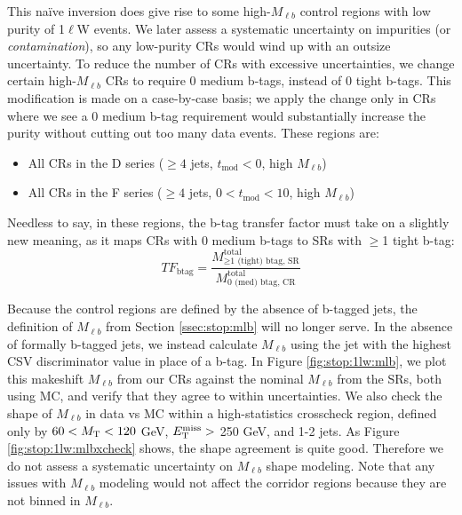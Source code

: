 This na\"{i}ve inversion does give rise to some high-$M_{\ell b}$ control regions with low
purity of 1$\ell$W events. We later assess a systematic uncertainty on
impurities (or \emph{contamination}), so any low-purity CRs would wind up
with an outsize uncertainty. To reduce the number of CRs with
excessive uncertainties, we change certain high-$M_{\ell b}$ CRs to
require 0 medium b-tags, instead of 0 tight b-tags. This modification
is made on a case-by-case basis; we apply the change only in CRs where
we see a 0 medium b-tag requirement would substantially increase the
purity without cutting out too many data events. These regions are:
\begin{itemize}
\item All CRs in the D series ($\geq 4$ jets, $t_\text{mod} < 0$, high $M_{\ell b}$)
\item All CRs in the F series ($\geq 4$ jets, $0 < t_\text{mod} < 10$, high $M_{\ell b}$)
\end{itemize}
Needless to say, in these regions, the b-tag transfer factor must take
on a slightly new meaning, as it maps CRs with 0 medium b-tags to
SRs with $\geq$1 tight b-tag:
\begin{equation}
TF_\text{btag} = \frac{M_{\geq\text{1 (tight) btag,
      SR}}^\text{total}}{M_\text{0 (med) btag, CR}^\text{total}}
\end{equation}

Because the control regions are defined by the absence of
b-tagged jets, the definition of $M_{\ell b}$ from Section
\ref{ssec:stop:mlb} will no longer serve. In the absence of formally
b-tagged jets, we instead calculate $M_{\ell b}$ using the jet with
the highest CSV discriminator value in place of a b-tag.
In Figure \ref{fig:stop:1lw:mlb}, we plot this makeshift
$M_{\ell b}$ from our CRs against the nominal $M_{\ell b}$ from the
SRs, both using MC, and verify that they agree to within
uncertainties. We also check the shape of $M_{\ell b}$ in data vs MC
within a high-statistics crosscheck region, defined only by $60 < M_\text{T}
< 120$ GeV, $E_\text{T}^\text{miss} >$ 250 GeV, and 1-2 jets. As Figure
\ref{fig:stop:1lw:mlbxcheck} shows, the
shape agreement is quite good. Therefore we
do not assess a systematic uncertainty on $M_{\ell b}$ shape
modeling. Note that any issues with $M_{\ell b}$ modeling
would not affect the corridor regions because they are not binned in
$M_{\ell b}$.

